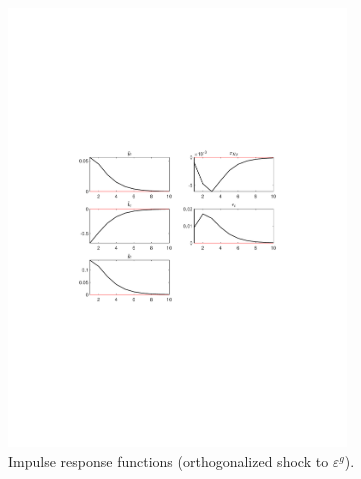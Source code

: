 \begin{figure}[H]
\centering 
\includegraphics[width=0.80\textwidth]{nash/graphs/nash_IRF_eps_g}
\caption{Impulse response functions (orthogonalized shock to ${\varepsilon^{g}}$).}
\label{Fig:IRF:eps_g}
\end{figure}
 
 
